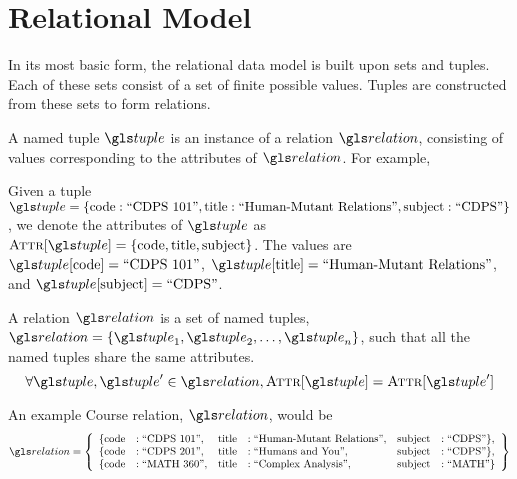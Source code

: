 \section{Relational Model}
	In its most basic form, the relational data model is built upon sets and tuples.  Each of these sets consist of a set of finite possible values.  Tuples are constructed from these sets to form relations.
	
	\begin{defn}
	\label{def:named-tuple}
		A named tuple \(\tuple\) is an instance of a relation \(\relation\), consisting of values corresponding to the attributes of \(\relation\).  For example,
	\end{defn}
	
	\begin{ex}
		Given a tuple \(\tuple = \{\text{code}: \text{``CDPS 101''}, \text{title}: \text{``Human-Mutant Relations''}, \text{subject}: \text{``CDPS''}\}\), we denote the attributes of \(\tuple\) as \(\attributes{\tuple} = \{\text{code}, \text{title}, \text{subject}\}\).  The values are \(\tuple\lbrack\text{code}\rbrack = \text{``CDPS 101''}\), \(\tuple\lbrack\text{title}\rbrack = \text{``Human-Mutant Relations''}\), and \(\tuple\lbrack\text{subject}\rbrack = \text{``CDPS''}\).
	\end{ex}
	
	\begin{defn}[Relation]
	\label{def:relation}
		A relation \(\relation\) is a set of named tuples, \(\relation = \{\tuple_1, \tuple_2, \dotsc, \tuple_n\}\), such that all the named tuples share the same attributes.
		\begin{equation}
			\forall \tuple, \tuple' \in \relation, \attributes{\tuple} = \attributes{\tuple'}
		\end{equation}
	\end{defn}
	
	\begin{ex}
		An example Course relation, \(\relation\), would be
		\[
			\relation = \left\{
				\begin{array}{llllll}
					\{\text{code} &: \text{``CDPS 101''}, &\text{title} &: \text{``Human-Mutant Relations''}, &\text{subject} &: \text{``CDPS''}\}, \\
					\{\text{code} &: \text{``CDPS 201''}, &\text{title} &: \text{``Humans and You''}, &\text{subject} &: \text{``CDPS''}\}, \\
					\{\text{code} &: \text{``MATH 360''}, &\text{title} &: \text{``Complex Analysis''}, &\text{subject} &: \text{``MATH''}\}
				\end{array}
			\right\}
		\]
	\end{ex}
		
